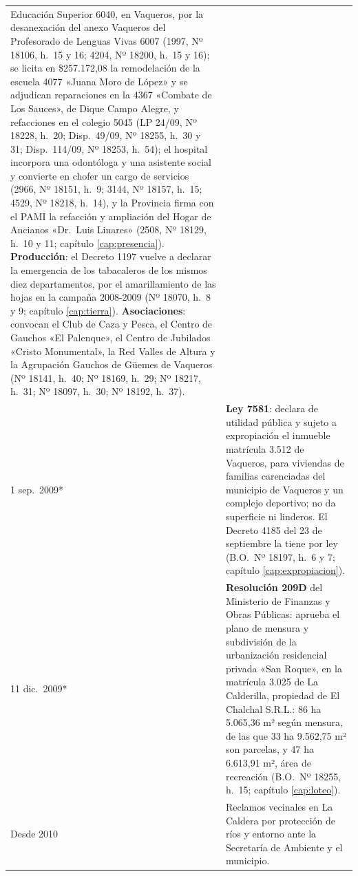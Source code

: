 \begin{longtable}{@{}p{2.7cm}p{10.3cm}@{}}
Educación Superior 6040, en Vaqueros, por la desanexación del anexo Vaqueros del Profesorado de Lenguas Vivas 6007 (1997, Nº 18106, h.\ 15 y 16; 4204, Nº 18200, h.\ 15 y 16); se licita en \$257.172,08 la remodelación de la escuela 4077 «Juana Moro de López» y se adjudican reparaciones en la 4367 «Combate de Los Sauces», de Dique Campo Alegre, y refacciones en el colegio 5045 (LP 24/09, Nº 18228, h.\ 20; Disp.\ 49/09, Nº 18255, h.\ 30 y 31; Disp.\ 114/09, Nº 18253, h.\ 54); el hospital incorpora una odontóloga y una asistente social y convierte en chofer un cargo de servicios (2966, Nº 18151, h.\ 9; 3144, Nº 18157, h.\ 15; 4529, Nº 18218, h.\ 14), y la Provincia firma con el PAMI la refacción y ampliación del Hogar de Ancianos «Dr.\ Luis Linares» (2508, Nº 18129, h.\ 10 y 11; capítulo \ref{cap:presencia}). \textbf{Producción}: el Decreto 1197 vuelve a declarar la emergencia de los tabacaleros de los mismos diez departamentos, por el amarillamiento de las hojas en la campaña 2008-2009 (Nº 18070, h.\ 8 y 9; capítulo \ref{cap:tierra}). \textbf{Asociaciones}: convocan el Club de Caza y Pesca, el Centro de Gauchos «El Palenque», el Centro de Jubilados «Cristo Monumental», la Red Valles de Altura y la Agrupación Gauchos de Güemes de Vaqueros (Nº 18141, h.\ 40; Nº 18169, h.\ 29; Nº 18217, h.\ 31; Nº 18097, h.\ 30; Nº 18192, h.\ 37). \\
1 sep.\ 2009* & \textbf{Ley 7581}: declara de utilidad pública y sujeto a expropiación el inmueble matrícula 3.512 de Vaqueros, para viviendas de familias carenciadas del municipio de Vaqueros y un complejo deportivo; no da superficie ni linderos. El Decreto 4185 del 23 de septiembre la tiene por ley (B.O.\ Nº 18197, h.\ 6 y 7; capítulo \ref{cap:expropiacion}). \\
11 dic.\ 2009* & \textbf{Resolución 209D} del Ministerio de Finanzas y Obras Públicas: aprueba el plano de mensura y subdivisión de la urbanización residencial privada «San Roque», en la matrícula 3.025 de La Calderilla, propiedad de El Chalchal S.R.L.: 86 ha 5.065,36 m² según mensura, de las que 33 ha 9.562,75 m² son parcelas, y 47 ha 6.613,91 m², área de recreación (B.O.\ Nº 18255, h.\ 15; capítulo \ref{cap:loteo}). \\
Desde 2010 & Reclamos vecinales en La Caldera por protección de ríos y entorno ante la Secretaría de Ambiente y el municipio. \\

\end{longtable}
